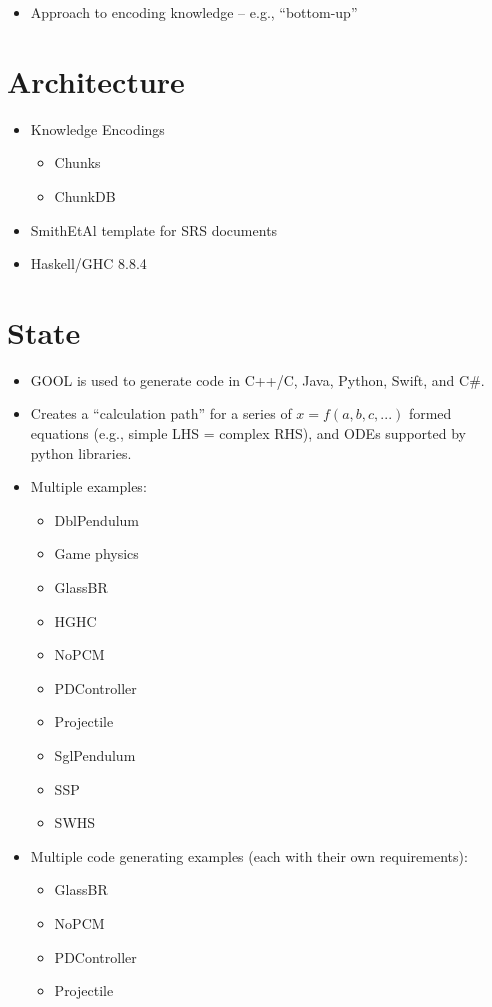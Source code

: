 \begin{itemize}
    \item Approach to encoding knowledge -- e.g., ``bottom-up''
\end{itemize}

\section{Architecture}

\begin{itemize}
    \item Knowledge Encodings
          \begin{itemize}
              \item Chunks
              \item ChunkDB
          \end{itemize}
    \item SmithEtAl template for SRS documents
    \item Haskell/GHC 8.8.4
\end{itemize}

\section{State}

\begin{itemize}
    \item GOOL is used to generate code in C++/C, Java, Python, Swift, and C\#.
    \item Creates a ``calculation path'' for a series of $x = f(a,b,c,...)$
          formed equations (e.g., simple LHS = complex RHS), and ODEs supported
          by python libraries.
    \item Multiple examples:
          \begin{itemize}
              \item DblPendulum
              \item Game physics
              \item GlassBR
              \item HGHC
              \item NoPCM
              \item PDController
              \item Projectile
              \item SglPendulum
              \item SSP
              \item SWHS
          \end{itemize}
    \item Multiple code generating examples (each with their own requirements):
          \begin{itemize}
              \item GlassBR
              \item NoPCM
              \item PDController
              \item Projectile
          \end{itemize}
\end{itemize}

